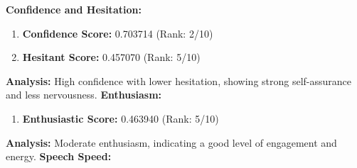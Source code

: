 \documentclass{article}
\begin{document}
\vspace{0.1in}
\large{\textbf{Confidence and Hesitation:}}
\begin{tcolorbox}[colback=green!5!white,colframe=green!75!black,title=Confidence and Hesitant Scores]
    \begin{enumerate}
        \item \textbf{Confidence Score:} \textcolor{green!50!black}{0.703714} (Rank: 2/10)
        \item \textbf{Hesitant Score:} \textcolor{red!70!black}{0.457070} (Rank: 5/10)
    \end{enumerate}
\end{tcolorbox}
    \textbf{Analysis:} High confidence with lower hesitation, showing strong self-assurance and less nervousness.
    \vspace{0.1in}
\large{\textbf{Enthusiasm:}}
\begin{tcolorbox}[ colback=purple!5!white,colframe=purple!75!black,  title=Enthusiastic Score]
    \begin{enumerate}
        \item \textbf{Enthusiastic Score:} \textcolor{orange!70!black}{0.463940} (Rank: 5/10)
    \end{enumerate}
\end{tcolorbox}
    \textbf{Analysis:} Moderate enthusiasm, indicating a good level of engagement and energy.
    \vspace{0.1in}
\large{\textbf{Speech Speed:}}
\end{document}
